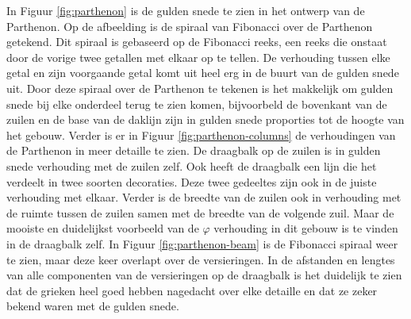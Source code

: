 \documentclass{article}
\begin{document}
In Figuur \ref{fig:parthenon} is de gulden snede te zien in het ontwerp van de Parthenon. Op de afbeelding is de spiraal van Fibonacci over de Parthenon getekend. Dit spiraal is gebaseerd op de Fibonacci reeks, een reeks die onstaat door de vorige twee getallen met elkaar op te tellen. De verhouding tussen elke getal en zijn voorgaande getal komt uit heel erg in de buurt van de gulden snede uit. Door deze spiraal over de Parthenon te tekenen is het makkelijk om gulden snede bij elke onderdeel terug te zien komen, bijvoorbeld de bovenkant van de zuilen en de base van de daklijn zijn in gulden snede proporties tot de hoogte van het gebouw. Verder is er in Figuur \ref{fig:parthenon-columns} de verhoudingen van de Parthenon in meer detaille te zien. De draagbalk op de zuilen is in gulden snede verhouding met de zuilen zelf. Ook heeft de draagbalk een lijn die het verdeelt in twee soorten decoraties. Deze twee gedeeltes zijn ook in de juiste verhouding met elkaar. Verder is de breedte van de zuilen ook in verhouding met de ruimte tussen de zuilen samen met de breedte van de volgende zuil. Maar de mooiste en duidelijkst voorbeeld van de \(\varphi\) verhouding in dit gebouw is te vinden in de draagbalk zelf. In Figuur \ref{fig:parthenon-beam} is de Fibonacci spiraal weer te zien, maar deze keer overlapt over de versieringen. In de afstanden en lengtes van alle componenten van de versieringen op de draagbalk is het duidelijk te zien dat de grieken heel goed hebben nagedacht over elke detaille en dat ze zeker bekend waren met de gulden snede.
\end{document}

